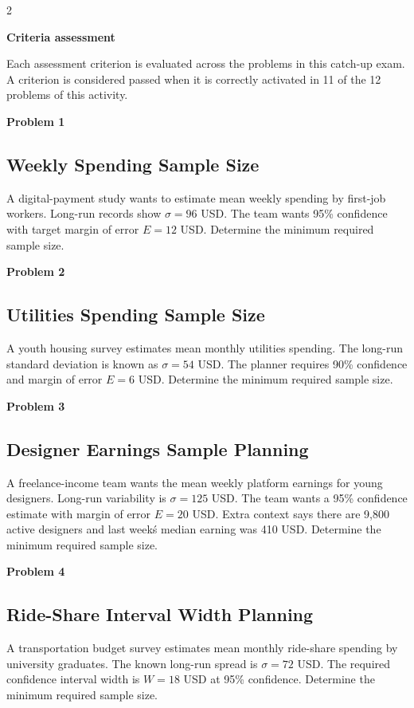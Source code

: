 \documentclass[12pt]{article}
\newcommand{\SubsectionBox}[1]{%
\noindent\colorbox{gray!30}{\parbox{\linewidth}{\textbf{#1}}}\par\vspace{0.35cm}%
}
\begin{document}
\begin{multicols}{2}
	\SubsectionBox{Criteria assessment}\vspace{-0.25cm}
	Each assessment criterion is evaluated across the problems in this catch-up exam. A criterion is considered passed when it is correctly activated in 11 of the 12 problems of this activity.

	\vspace{0.25cm}
\SubsectionBox{Problem 1}
\subsection*{Weekly Spending Sample Size}
A digital-payment study wants to estimate mean weekly spending by first-job workers. Long-run records show $\sigma = 96$ USD. The team wants 95\% confidence with target margin of error $E = 12$ USD. Determine the minimum required sample size.

\vspace{0.5cm}
\SubsectionBox{Problem 2}
\subsection*{Utilities Spending Sample Size}
A youth housing survey estimates mean monthly utilities spending. The long-run standard deviation is known as $\sigma = 54$ USD. The planner requires 90\% confidence and margin of error $E = 6$ USD. Determine the minimum required sample size.

\vspace{0.5cm}
\SubsectionBox{Problem 3}
\subsection*{Designer Earnings Sample Planning}
A freelance-income team wants the mean weekly platform earnings for young designers. Long-run variability is $\sigma = 125$ USD. The team wants a 95\% confidence estimate with margin of error $E = 20$ USD. Extra context says there are 9{,}800 active designers and last week\'s median earning was 410 USD. Determine the minimum required sample size.

\vspace{0.5cm}
\SubsectionBox{Problem 4}
\subsection*{Ride-Share Interval Width Planning}
A transportation budget survey estimates mean monthly ride-share spending by university graduates. The known long-run spread is $\sigma = 72$ USD. The required confidence interval width is $W = 18$ USD at 95\% confidence. Determine the minimum required sample size.


\end{multicols}
\end{document}
